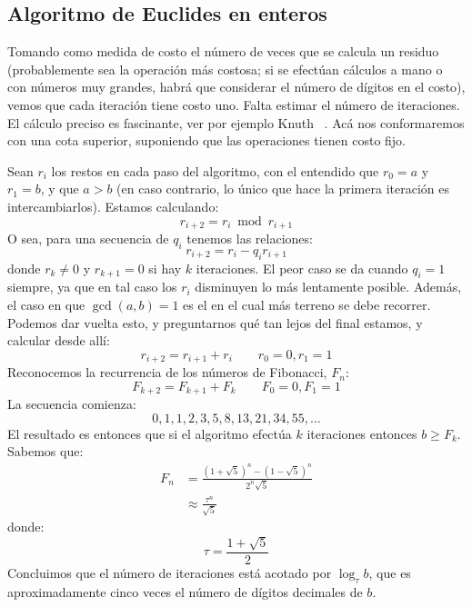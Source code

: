 \subsection{Algoritmo de Euclides en enteros}
\label{sec:GCD-integer}

  Tomando como medida de costo el número de veces que se calcula un residuo
  (probablemente sea la operación más costosa;
   si se efectúan cálculos a mano o con números muy grandes,
   habrá que considerar el número de dígitos en el costo),
  vemos que cada iteración tiene costo uno.
  Falta estimar el número de iteraciones.
  El cálculo preciso es fascinante,
  ver por ejemplo Knuth~%
    \cite[sección~4.5.3]{knuth97:_semin_algor}.
  Acá nos conformaremos con una cota superior,
  suponiendo que las operaciones tienen costo fijo.

  Sean \(r_i\) los restos en cada paso del algoritmo,
  con el entendido que \(r_0 = a\) y \(r_1 = b\),
  y que \(a > b\)
  (en caso contrario,
   lo único que hace la primera iteración es intercambiarlos).
  Estamos calculando:
  \begin{equation*}
    r_{i + 2} = r_i \bmod r_{i + 1}
  \end{equation*}
  O sea,
  para una secuencia de \(q_i\)
  tenemos las relaciones:
  \begin{equation*}
    r_{i + 2} = r_i - q_i r_{i + 1}
  \end{equation*}
  donde \(r_k \ne 0\) y \(r_{k + 1} = 0\)
  si hay \(k\) iteraciones.
  El peor caso se da cuando \(q_i = 1\) siempre,
  ya que en tal caso
  los \(r_i\) disminuyen lo más lentamente posible.
  Además,
  el caso en que \(\gcd(a, b) = 1\)
  es el en el cual más terreno se debe recorrer.
  Podemos dar vuelta esto,
  y preguntarnos qué tan lejos del final estamos,
  y calcular desde allí:
  \begin{equation*}
    r_{i + 2}
      = r_{i + 1} + r_i
      \qquad r_0 = 0, r_1 = 1
  \end{equation*}
  Reconocemos la recurrencia de los números de Fibonacci,
  \(F_n\):
  \begin{equation}
    \label{eq:Fibonacci}
    F_{k + 2} = F_{k + 1} + F_k \qquad F_0 = 0, F_1 = 1
  \end{equation}
  La secuencia comienza:
  \begin{equation*}
    0, 1, 1, 2, 3, 5, 8, 13, 21, 34, 55, \dotsc
  \end{equation*}
  El resultado es entonces
  que si el algoritmo efectúa \(k\) iteraciones
  entonces \(b \ge F_k\).
  Sabemos que:
  \begin{align*}
    F_n
      &=       \frac{(1 + \sqrt{5})^n - (1 - \sqrt{5})^n}{2^n \sqrt{5}} \\
      &\approx \frac{\tau^n}{\sqrt{5}}
  \end{align*}
  donde:
  \begin{equation*}
    \tau
      = \frac{1 + \sqrt{5}}{2}
  \end{equation*}
  Concluimos que el número de iteraciones
  está acotado por \(\log_\tau b\),
  que es aproximadamente cinco veces el número de dígitos decimales de \(b\).

